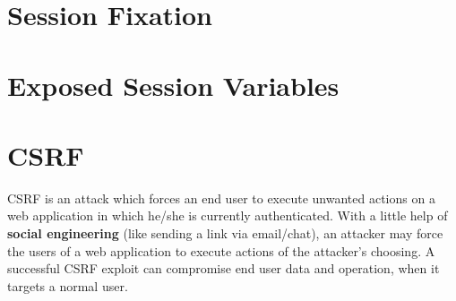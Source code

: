 	\section{Session Fixation}

	\section{Exposed Session Variables}

	\section{CSRF}

		CSRF is an attack which forces an end user to execute unwanted actions on a web application 
		in which he/she is currently authenticated. With a little help of {\bf social engineering} 
		(like sending a link via email/chat), an attacker may force the users of a web application 
		to execute actions of the attacker's choosing. A successful CSRF exploit can compromise end 
		user data and operation, when it targets a normal user. 

		